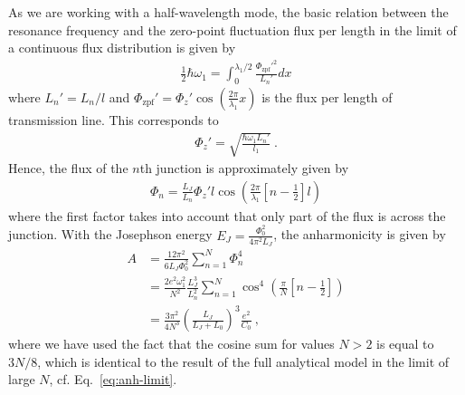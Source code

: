 As we are working with a half-wavelength mode, the basic relation between the resonance frequency and the zero-point fluctuation flux per length in the limit of a continuous flux distribution is given by
%
\begin{align}
\frac{1}{2}\hbar \omega_1 = \int_0^{\lambda_1/2} \frac{\Phi_\mathrm{zpf}'^2}{L_n'} dx
\end{align}
%
where $L_n' = L_n/l$ and $\Phi_\mathrm{zpf}' = \Phi_z'\cos\left(\frac{2\pi}{\lambda_1}x\right)$ is the flux per length of transmission line.
%
This corresponds to
%
\begin{align}
\Phi_z' = \sqrt{\frac{\hbar \omega_1 L_n'}{l_1}}\ .
\end{align}
%
Hence, the flux of the $n$th junction is approximately given by
%
\begin{align}
\Phi_n = \frac{L_J}{L_n}\Phi_z' l \cos{\left(\frac{2\pi}{\lambda_1}\left[n-\frac{1}{2}\right]l\right)}
\end{align}
%
where the first factor takes into account that only part of the flux is across the junction.
%
With the Josephson energy $E_J = \frac{\Phi_0^2}{4\pi^2 L_J}$, the anharmonicity is given by
%
\begin{align}
A &= \frac{12\pi^2}{6L_J\Phi_0^2}\sum_{n=1}^N \Phi_n^4 \\
&= \frac{2e^2 \omega_1^2}{N^2} \frac{L_J^3}{L_n^2}\sum_{n=1}^{N}\cos^4\left(\frac{\pi}{N}\left[n-\frac{1}{2}\right] \right) \\
&= \frac{3\pi^2}{4N^3}\left(\frac{L_J}{L_J+L_0}\right)^3 \frac{e^2}{C_0} \ ,
\label{eq:anh-closed}
\end{align}
%
where we have used the fact that the cosine sum for values $N>2$ is equal to $3N/8$, which is identical to the result of the full analytical model in the limit of large $N$, cf. Eq.~\eqref{eq:anh-limit}.



